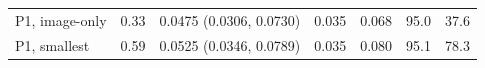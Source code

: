\begin{tabular}{lrrrrrr}
P1, image-only & 0.33 & 0.0475 (0.0306, 0.0730) & 0.035 & 0.068 & 95.0 & 37.6 \\
P1, smallest & 0.59 & 0.0525 (0.0346, 0.0789) & 0.035 & 0.080 & 95.1 & 78.3 \\
\midrule

\end{tabular}
